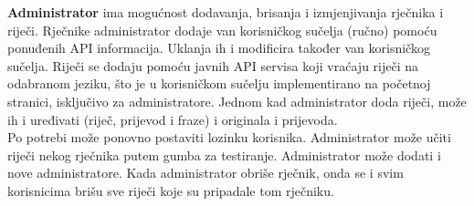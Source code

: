 		\indent \textbf{Administrator} ima mogućnost dodavanja, brisanja i izmjenjivanja rječnika i riječi. Rječnike administrator dodaje van korisničkog sučelja (ručno) pomoću ponuđenih API informacija. Uklanja ih i modificira također van korisničkog sučelja. Riječi se dodaju pomoću javnih API servisa koji vraćaju riječi na odabranom jeziku, što je u korisničkom sučelju implementirano na početnoj stranici, isključivo za administratore. Jednom kad administrator doda riječi, može ih i uređivati (riječ, prijevod i fraze) i originala i prijevoda.
		\\

		\noindent Po potrebi može ponovno postaviti lozinku korisnika. Administrator može učiti riječi nekog rječnika putem gumba za testiranje. Administrator može dodati i nove administratore. Kada administrator obriše rječnik, onda se i svim korisnicima brišu sve riječi koje su pripadale tom rječniku.
		\\
		\\

		\eject
		
	